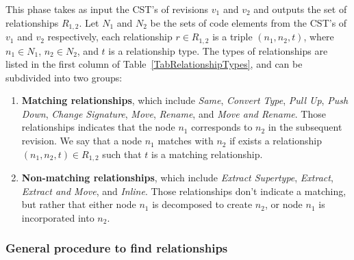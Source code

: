 This phase takes as input the CST's of revisions $v_1$ and $v_2$ and outputs the set of relationships $R_{1,2}$. Let $N_1$ and $N_2$ be the sets of code elements from the CST's of $v_1$ and $v_2$ respectively, each relationship $r \in R_{1,2}$ is a triple $(n_1, n_2, t)$, where $n_1 \in N_1$, $n_2 \in N_2$, and $t$ is a relationship type. The types of relationships are listed in the first column of Table~\ref{TabRelationshipTypes}, and can be subdivided into two groups:
\begin{enumerate}
\item \textbf{Matching relationships}, which include \textit{Same}, \textit{Convert Type}, \textit{Pull Up}, \textit{Push Down}, \textit{Change Signature}, \textit{Move}, \textit{Rename}, and \textit{Move and Rename}.
Those relationships indicates that the node $n_1$ corresponds to $n_2$ in the subsequent revision.
We say that a node $n_1$ matches with $n_2$ if exists a relationship $(n_1, n_2, t) \in R_{1,2}$ such that $t$ is a matching relationship.

\item \textbf{Non-matching relationships}, which include \textit{Extract Supertype}, \textit{Extract}, \textit{Extract and Move}, and \textit{Inline}.
Those relationships don't indicate a matching, but rather that either node $n_1$ is decomposed to create $n_2$, or node $n_1$ is incorporated into $n_2$.
\end{enumerate}


\subsubsection{General procedure to find relationships}

